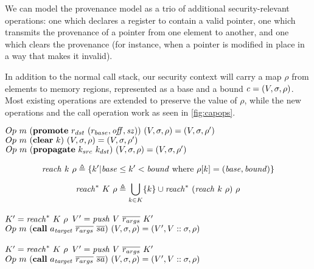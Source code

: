 \documentclass[10pt,conference]{ieeetran}%
\theoremstyle{definition}
\begin{document}
We can model the provenance model as a trio of additional security-relevant operations: one which
declares a register to contain a valid pointer, one which transmits the provenance
of a pointer from one element to another, and one which clears the provenance
(for instance, when a pointer is modified in place in a way that makes it invalid).

In addition to the normal call stack, our security context will carry a map \(\rho\) from
elements to memory regions, represented as a base and a bound \(\mathit{c} = (V, \sigma, \rho)\).
Most existing operations are extended to preserve the value of \(\rho\), while the new operations
and the call operation work as seen in \cref{fig:capops}.

\begin{figure*}
             {\(Op ~ m ~ (\mathbf{promote} ~ r_{dst} ~ (r_{base},\mathit{off},\mathit{sz})) ~ (V,\sigma,\rho) = (V,\sigma,\rho')\)}
             {\(Op ~ m ~ (\mathbf{clear} ~ k) ~ (V,\sigma,\rho) = (V,\sigma,\rho')\)}
             {\(Op ~ m ~ (\mathbf{propagate} ~ k_{src} ~ k_{dst}) ~ (V,\sigma,\rho) = (V,\sigma,\rho')\)}

    \[\mathit{reach} ~ k ~ \rho \triangleq \{k' | \mathit{base} \leq k' < \mathit{bound}
    \textnormal{ where } \rho[k] = (\mathit{base},\mathit{bound})\}\]

    \[\mathit{reach}^* ~ K ~ \rho \triangleq \bigcup_{k \in K} \{ k \} \cup \mathit{reach}^* ~ (\mathit{reach} ~ k ~ \rho) ~ \rho\]

    \vspace{\abovedisplayskip}
        {\(K' = \mathit{reach}^* ~ K ~ \rho\)}
        {\(V' = \mathit{push} ~ V ~ \overline{r_{args}} ~ K'\)}
        {\(Op ~ m ~ (\mathbf{call} ~ a_{\mathit{target}} ~ \overline{r_{args}} ~ \overline{sa}) ~ (V,\sigma,\rho) = (V',V::\sigma,\rho)\)}

    \vspace{\abovedisplayskip}
        {\(K' = \mathit{reach}^* ~ K ~ \rho\)}
        {\(V' = \mathit{push} ~ V ~ \overline{r_{args}} ~ K'\)}
        {\(Op ~ m ~ (\mathbf{call} ~ a_{\mathit{target}} ~ \overline{r_{args}} ~ \overline{sa}) ~ (V,\sigma,\rho) = (V',V::\sigma,\rho)\)}

    \caption{Operations supporting provenance-based protection of passed objects}
    \label{fig:capops}
\end{figure*}
\end{document}
